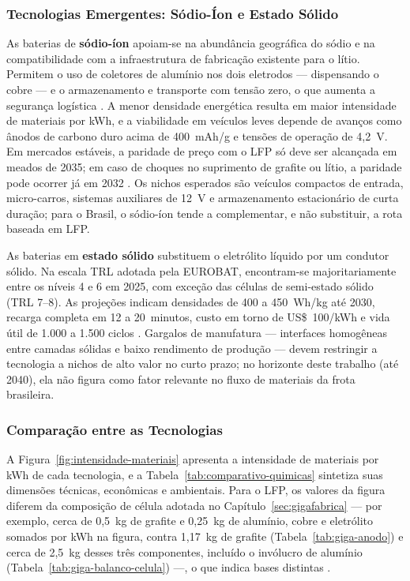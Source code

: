\subsubsection{Tecnologias Emergentes: Sódio-Íon e Estado Sólido}
\label{subsec:naion}
\label{subsec:estadosolido}

As baterias de \textbf{sódio-íon} apoiam-se na abundância geográfica do sódio e na
compatibilidade com a infraestrutura de fabricação existente para o lítio.
Permitem o uso de coletores de alumínio nos dois eletrodos — dispensando o cobre —
e o armazenamento e transporte com tensão zero, o que aumenta a segurança
logística \cite{McKinsey2026}. A menor densidade energética resulta em maior
intensidade de materiais por kWh, e a viabilidade em veículos leves depende de
avanços como ânodos de carbono duro acima de 400~mAh/g e tensões de operação de
4,2~V. Em mercados estáveis, a paridade de preço com o LFP só deve ser alcançada
em meados de 2035; em caso de choques no suprimento de grafite ou lítio, a
paridade pode ocorrer já em 2032 \cite{McKinsey2026}. Os nichos esperados são
veículos compactos de entrada, micro-carros, sistemas auxiliares de 12~V e
armazenamento estacionário de curta duração; para o Brasil, o sódio-íon tende a
complementar, e não substituir, a rota baseada em LFP.

As baterias em \textbf{estado sólido} substituem o eletrólito líquido por um
condutor sólido. Na escala TRL adotada pela EUROBAT, encontram-se majoritariamente
entre os níveis 4 e 6 em 2025, com exceção das células de semi-estado sólido
(TRL 7--8). As projeções indicam densidades de 400 a 450~Wh/kg até 2030, recarga
completa em 12 a 20~minutos, custo em torno de US\$~100/kWh e vida útil de 1.000 a
1.500 ciclos \cite{McKinsey2026}. Gargalos de manufatura — interfaces homogêneas
entre camadas sólidas e baixo rendimento de produção — devem restringir a
tecnologia a nichos de alto valor no curto prazo; no horizonte deste trabalho
(até 2040), ela não figura como fator relevante no fluxo de materiais da frota
brasileira.

\subsubsection{Comparação entre as Tecnologias}
\label{sec:comparacao}

A Figura~\ref{fig:intensidade-materiais} apresenta a intensidade de materiais por
kWh de cada tecnologia, e a Tabela~\ref{tab:comparativo-quimicas} sintetiza suas
dimensões técnicas, econômicas e ambientais. Para o LFP, os valores da figura
diferem da composição de célula adotada no Capítulo~\ref{sec:gigafabrica} —
por exemplo, cerca de 0,5~kg de grafite e 0,25~kg de alumínio, cobre e
eletrólito somados por kWh na figura, contra 1,17~kg de grafite
(Tabela~\ref{tab:giga-anodo}) e cerca de 2,5~kg desses três componentes,
incluído o invólucro de alumínio (Tabela~\ref{tab:giga-balanco-celula}) —, o
que indica bases distintas
.

